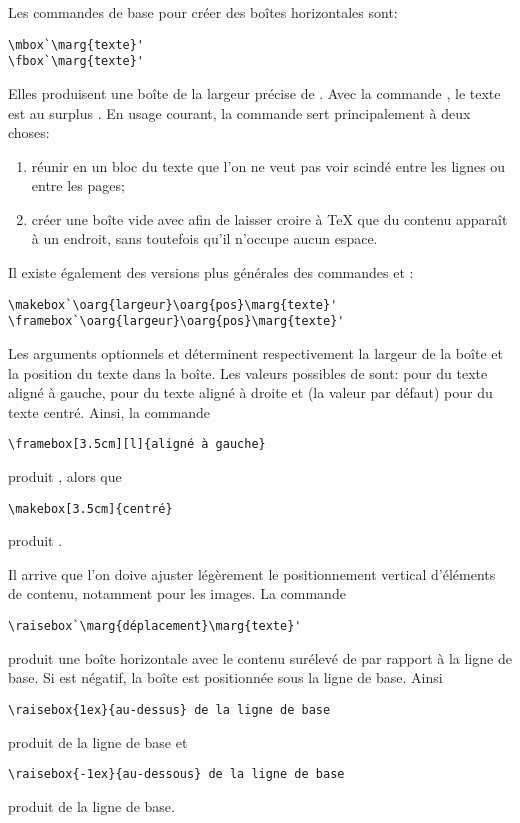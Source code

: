 Les commandes de base pour créer des boîtes horizontales sont:
\begin{lstlisting}
\mbox`\marg{texte}'
\fbox`\marg{texte}'
\end{lstlisting}
Elles produisent une boîte de la largeur précise de . Avec
la commande \cmd{\fbox}, le texte est au surplus . En
usage courant, la commande \cmd{\mbox} sert principalement à deux
choses:
\begin{enumerate}
\item réunir en un bloc du texte que l'on ne veut pas voir scindé
  entre les lignes ou entre les pages;
\item \label{item:tableaux:mbox} créer une boîte vide avec
   afin de laisser croire à {\TeX} que du contenu
  apparaît à un endroit, sans toutefois qu'il n'occupe aucun espace.
\end{enumerate}

Il existe également des versions plus générales des commandes
\cmd{\mbox} et \cmd{\fbox}:
\begin{lstlisting}
\makebox`\oarg{largeur}\oarg{pos}\marg{texte}'
\framebox`\oarg{largeur}\oarg{pos}\marg{texte}'
\end{lstlisting}
Les arguments optionnels  et  déterminent
respectivement la largeur de la boîte et la position du texte
dans la boîte. Les valeurs possibles de  sont:  pour
du texte aligné à gauche,  pour du texte aligné à droite et
 (la valeur par défaut) pour du texte centré. Ainsi, la commande
\begin{lstlisting}
\framebox[3.5cm][l]{aligné à gauche}
\end{lstlisting}
produit , alors que
\begin{lstlisting}
\makebox[3.5cm]{centré}
\end{lstlisting}
produit .

Il arrive que l'on doive ajuster légèrement le positionnement vertical
d'éléments de contenu, notamment pour les images. La commande
\begin{lstlisting}
\raisebox`\marg{déplacement}\marg{texte}'
\end{lstlisting}
produit une boîte horizontale avec le contenu  surélevé de
 par rapport à la ligne de base. Si
 est négatif, la boîte est positionnée sous la ligne
de base. Ainsi
\begin{lstlisting}
\raisebox{1ex}{au-dessus} de la ligne de base
\end{lstlisting}
produit  \raisebox{1ex}{au-dessus} de la ligne de base et
\begin{lstlisting}
\raisebox{-1ex}{au-dessous} de la ligne de base
\end{lstlisting}
produit \raisebox{-1ex}{au-dessous} de la ligne de base.

